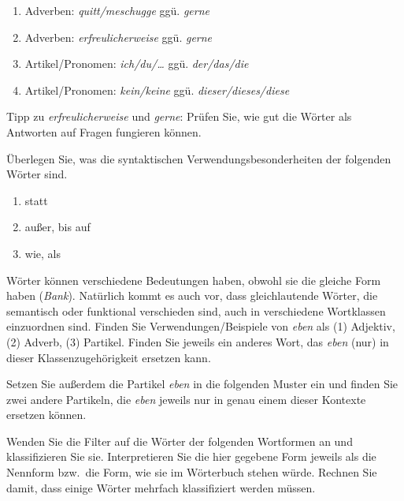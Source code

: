 \begin{enumerate}
  \item Adverben: \textit{quitt/meschugge} ggü. \textit{gerne}
  \item Adverben: \textit{erfreulicherweise} ggü. \textit{gerne}
  \item Artikel/Pronomen: \textit{ich/du/\ldots} ggü. \textit{der/das/die}
  \item Artikel/Pronomen: \textit{kein/keine} ggü. \textit{dieser/dieses/diese}
\end{enumerate}

Tipp zu \textit{erfreulicherweise} und \textit{gerne}:
Prüfen Sie, wie gut die Wörter als Antworten auf Fragen fungieren können.

 \label{exc:wortklassen03} Überlegen Sie, was die syntaktischen Verwendungsbesonderheiten der folgenden Wörter sind.

\begin{enumerate}
  \item statt
  \item außer, bis auf
  \item wie, als
\end{enumerate}

 \label{exc:wortklassen04} Wörter können verschiedene Bedeutungen haben, obwohl sie die gleiche Form haben (\zB \textit{Bank}).
Natürlich kommt es auch vor, dass gleichlautende Wörter, die semantisch oder funktional verschieden sind, auch in verschiedene Wortklassen einzuordnen sind.
Finden Sie Verwendungen/Beispiele von \textit{eben} als (1) Adjektiv, (2) Adverb, (3) Partikel.
Finden Sie jeweils ein anderes Wort, das \textit{eben} (nur) in dieser Klassenzugehörigkeit ersetzen kann.

Setzen Sie außerdem die Partikel \textit{eben} in die folgenden Muster ein und finden Sie zwei andere Partikeln, die \textit{eben} jeweils nur in genau einem dieser Kontexte ersetzen können.

\begin{exe}
\end{exe}

 \label{exc:wortklassen05} Wenden Sie die Filter auf die Wörter der folgenden Wortformen an und klassifizieren Sie sie.
Interpretieren Sie die hier gegebene Form jeweils als die Nennform bzw.\ die Form, wie sie im Wörterbuch stehen würde.
Rechnen Sie damit, dass einige Wörter mehrfach klassifiziert werden müssen.

